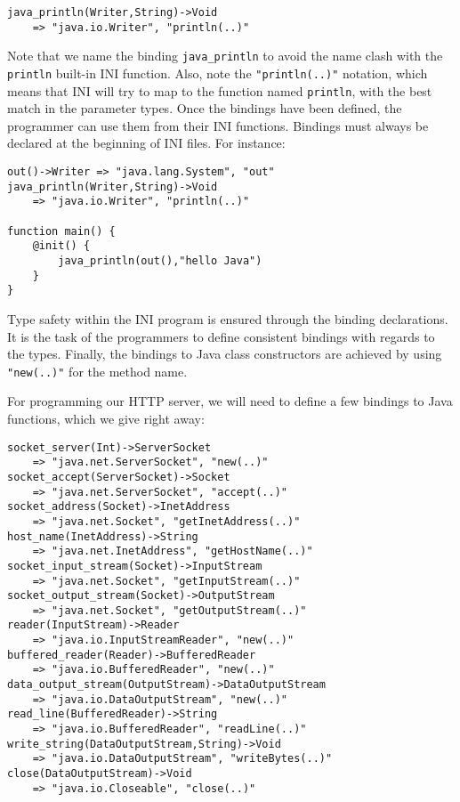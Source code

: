 \documentclass[11pt]{article}
\begin{document}
\begin{lstlisting}[numbers=none]
java_println(Writer,String)->Void
	=> "java.io.Writer", "println(..)"
\end{lstlisting}

Note that we name the binding \texttt{java\_println} to avoid the name clash with the \texttt{println} built-in INI function. Also, note the \texttt{"println(..)"} notation, which means that INI will try to map to the function named \texttt{println}, with the best match in the parameter types. Once the bindings have been defined, the programmer can use them from their INI functions. Bindings must always be declared at the beginning of INI files. For instance:

\begin{lstlisting}
out()->Writer => "java.lang.System", "out"
java_println(Writer,String)->Void
	=> "java.io.Writer", "println(..)"

function main() {
	@init() {
		java_println(out(),"hello Java")
	}
}
\end{lstlisting}

Type safety within the INI program is ensured through the binding declarations. It is the task of the programmers to define consistent bindings with regards to the types. Finally, the bindings to Java class constructors are achieved by using \texttt{"new(..)"} for the method name.

For programming our HTTP server, we will need to define a few bindings to Java functions, which we give right away:

{\small \begin{lstlisting}
socket_server(Int)->ServerSocket
	=> "java.net.ServerSocket", "new(..)"
socket_accept(ServerSocket)->Socket
	=> "java.net.ServerSocket", "accept(..)"
socket_address(Socket)->InetAddress
	=> "java.net.Socket", "getInetAddress(..)"
host_name(InetAddress)->String
	=> "java.net.InetAddress", "getHostName(..)"
socket_input_stream(Socket)->InputStream
	=> "java.net.Socket", "getInputStream(..)"
socket_output_stream(Socket)->OutputStream
	=> "java.net.Socket", "getOutputStream(..)"
reader(InputStream)->Reader
	=> "java.io.InputStreamReader", "new(..)"
buffered_reader(Reader)->BufferedReader
	=> "java.io.BufferedReader", "new(..)"
data_output_stream(OutputStream)->DataOutputStream
	=> "java.io.DataOutputStream", "new(..)"
read_line(BufferedReader)->String
	=> "java.io.BufferedReader", "readLine(..)"
write_string(DataOutputStream,String)->Void
	=> "java.io.DataOutputStream", "writeBytes(..)"
close(DataOutputStream)->Void
	=> "java.io.Closeable", "close(..)"
\end{lstlisting} }
\end{document}
